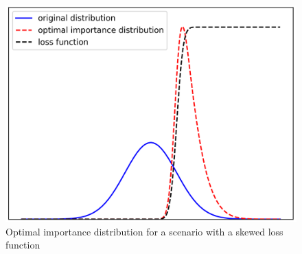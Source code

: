     \begin{figure}[H]
        \centering
        \includegraphics[scale=0.50]{Manuscript/Figures/Images/Methods/optimal_IS_dist_case4.png}
        \caption{Optimal importance distribution for a scenario with a skewed loss function}
        \label{fig:optimal_IS_dist_case4}
    \end{figure}
